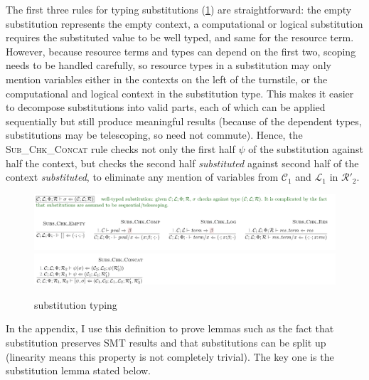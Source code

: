The first three rules for typing substitutions (\cref{fig:soundness-sub}) are
straightforward: the empty substitution represents the empty context, a
computational or logical substitution requires the substituted value to be well
typed, and same for the resource term. However, because resource terms and
types can depend on the first two, scoping needs to be handled carefully,
so resource types in a substitution may only mention variables
either in the contexts on the left of the turnstile, or the computational
and logical context in the substitution type. This makes it easier to decompose
substitutions into valid parts, each of which can be applied sequentially but
still produce meaningful results (because of the dependent types,
substitutions may be telescoping, so need not commute). Hence, the
\textsc{Sub\_Chk\_Concat} rule checks not only the first half $\psi$ of the
substitution against half the context, but checks the second half
\emph{substituted} against second half of the context \emph{substituted}, to
eliminate any mention of variables from $\mathcal{C}_1$ and $\mathcal{L}_1$ in
$\mathcal{R}'_2$.

\begin{figure}[tp]
    \includegraphics{figures/kernel-soundness-sub-1}
    \includegraphics{figures/kernel-soundness-sub-2}
    \caption{ substitution typing}\label{fig:soundness-sub}
\end{figure}

In the appendix, I use this definition to prove lemmas such as the fact that substitution
preserves SMT results and that substitutions can be split up (linearity means
this property is not completely trivial). The key one is the substitution
lemma stated below.

